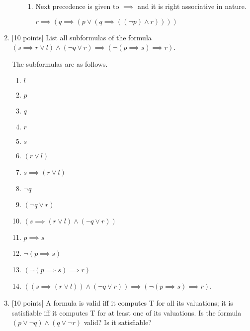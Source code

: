 \documentclass{article}
\begin{document}
\begin{enumerate}
\begin{enumerate}
\begin{answer}
\begin{enumerate}
		\item Next precedence is given to $\implies$ and it is right associative in
		nature. 
		
			$r \implies (q \implies (p \lor (q \implies ((\neg p) \land r))))$
		\end{enumerate}
	\end{answer}
  \end{enumerate}

\item {[10 points]} List all subformulas of the formula $(s \implies r
  \lor l) \land (\neg q \lor r) \implies (\neg (p \implies s) \implies
  r)$.
  
  \begin{answer}
  
  	The subformulas are as follows.
  	\begin{enumerate}
  	  
  	  \item $l$
  	  \item $p$
  	  \item $q$
  	  \item $r$
  	  \item $s$
  	  \item $(r \lor l)$
  	  \item $s \implies (r \lor l)$
  	  \item $\neg q$
  	  \item $(\neg q \lor r)$
  	  \item $(s \implies (r \lor l) \land (\neg q \lor r))$
  	  \item $p \implies s$
  	  \item $\neg (p \implies s)$
  	  \item $(\neg (p \implies s) \implies r)$
  	  \item $((s \implies (r \lor l)) \land (\neg q \lor r)) \implies (\neg (p
  	  \implies s) \implies r)$.
  	  
   	\end{enumerate}
  	
  \end{answer}

\item {[10 points]} A formula is valid iff it computes T for all its
  valuations; it is satisfiable iff it computes T for at least one of
  its valuations.  Is the formula $(p \lor \neg q) \land (q \lor \neg
  r)$ valid?  Is it satisfiable?

	\begin{answer}
	

\end{answer}
\end{enumerate}
\end{document}
